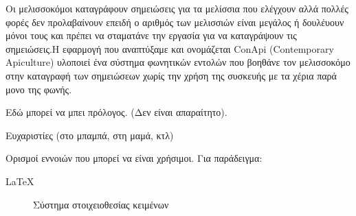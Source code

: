 \documentclass[oneside, 12pt]{book}
\begin{document}
\Titlepage
\Declarationpage
\begin{Abstract}
  Οι μελισσοκόμοι καταγράφουν σημειώσεις για τα μελίσσια που ελέγχουν αλλά πολλές φορές δεν
  προλαβαίνουν επειδή ο αριθμός των μελισσιών είναι μεγάλος ή δουλέυουν μόνοι τους και πρέπει να
  σταματάνε την εργασία για να καταγράψουν τις σημειώσεις.Η εφαρμογή που αναπτύξαμε και ονομάζεται
  ConApi (Contemporary Apiculture) υλοποιεί ένα σύστημα φωνητικών εντολών που βοηθάνε τον
  μελισσοκόμο στην καταγραφή των σημειώσεων χωρίς την χρήση της συσκευής με τα χέρια παρά μονο της
  φωνής.
\end{Abstract}
\tableofcontents

\listoftables
\listoffigures

\begin{Preface}
Εδώ μπορεί να μπει πρόλογος. (Δεν είναι απαραίτητο).
\end{Preface}

\begin{Acknowledgement}
Ευχαριστίες (στο μπαμπά, στη μαμά, κτλ)
\end{Acknowledgement}

\begin{Definitions}
Ορισμοί εννοιών που μπορεί να είναι χρήσιμοι. Για παράδειγμα:

\begin{description}
\item [\LaTeX] Σύστημα στοιχειοθεσίας κειμένων
\end{description}

\end{Definitions}

\end{document}
